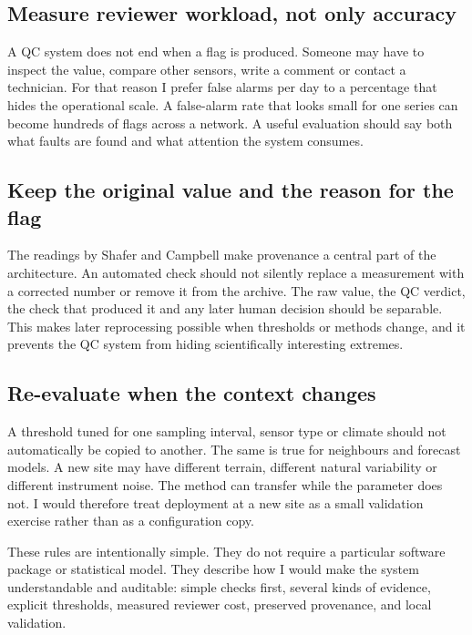 \subsection{Measure reviewer workload, not only accuracy}

A QC system does not end when a flag is produced. Someone may have to inspect
the value, compare other sensors, write a comment or contact a technician.
For that reason I prefer false alarms per day to a percentage that hides the
operational scale. A false-alarm rate that looks small for one series can
become hundreds of flags across a network. A useful evaluation should say
both what faults are found and what attention the system consumes.

\subsection{Keep the original value and the reason for the flag}

The readings by Shafer and Campbell make provenance a central part of the
architecture. An automated check should not silently replace a measurement
with a corrected number or remove it from the archive. The raw value, the QC
verdict, the check that produced it and any later human decision should be
separable. This makes later reprocessing possible when thresholds or methods
change, and it prevents the QC system from hiding scientifically interesting
extremes.

\subsection{Re-evaluate when the context changes}

A threshold tuned for one sampling interval, sensor type or climate should
not automatically be copied to another. The same is true for neighbours and
forecast models. A new site may have different terrain, different natural
variability or different instrument noise. The method can transfer while the
parameter does not. I would therefore treat deployment at a new site as a
small validation exercise rather than as a configuration copy.

These rules are intentionally simple. They do not require a particular
software package or statistical model. They describe how I would make the
system understandable and auditable: simple checks first, several kinds of
evidence, explicit thresholds, measured reviewer cost, preserved provenance,
and local validation.



